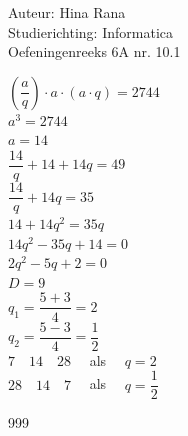 \documentclass[a4paper]{article}
\begin{document}
\noindent \large Auteur: Hina Rana \\
\noindent \large Studierichting: Informatica\\
\noindent \large Oefeningenreeks 6A nr. 10.1 \\

\medskip

\normalsize

$ \left( \dfrac{a}{q} \right) \cdot a \cdot (a \cdot q) = 2744 $ \\

$ a^3 = 2744 $ \\

$ a = 14 $ \\

$ \dfrac{14}{q} + 14 + 14q = 49 $ \\

$ \dfrac{14}{q} + 14q = 35 $ \\

$ 14 + 14q^2 = 35q $ \\

$ 14q^2 - 35q + 14 = 0 $ \\

$ 2q^2 - 5q + 2 = 0 $ \\

$ D = 9 $ \\

$ q_1 = \dfrac{5+3}{4} = 2 $ \\

$ q_2 = \dfrac{5-3}{4} = \dfrac{1}{2} $ \\

$ 7 \quad 14 \quad 28 \quad $ als $\quad q = 2 $ \\

$ 28 \quad 14 \quad 7 \quad $  als $ \quad q = \dfrac{1}{2} $


\begin{thebibliography}{999}
\end{thebibliography}
\end{document}
